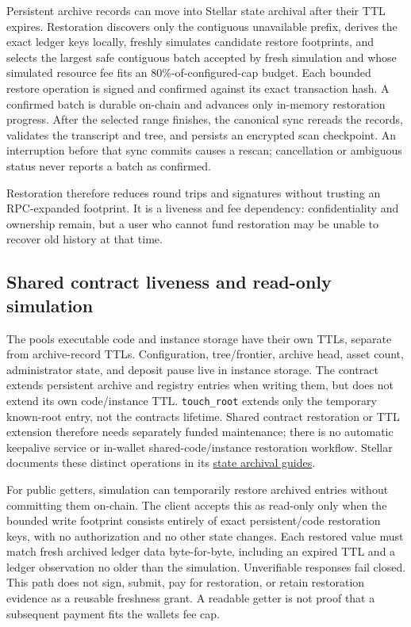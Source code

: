\documentclass[11pt,letterpaper]{article}
\begin{document}
Persistent archive records can move into Stellar state archival after
their TTL expires. Restoration discovers only the contiguous unavailable
prefix, derives the exact ledger keys locally, freshly simulates
candidate restore footprints, and selects the largest safe contiguous
batch accepted by fresh simulation and whose simulated resource fee fits
an 80\%-of-configured-cap budget. Each bounded restore operation is
signed and confirmed against its exact transaction hash. A confirmed
batch is durable on-chain and advances only in-memory restoration
progress. After the selected range finishes, the canonical sync rereads
the records, validates the transcript and tree, and persists an
encrypted scan checkpoint. An interruption before that sync commits
causes a rescan; cancellation or ambiguous status never reports a batch
as confirmed.

Restoration therefore reduces round trips and signatures without
trusting an RPC-expanded footprint. It is a liveness and fee dependency:
confidentiality and ownership remain, but a user who cannot fund
restoration may be unable to recover old history at that time.

\subsection{Shared contract liveness and read-only
simulation}\label{shared-contract-liveness-and-read-only-simulation}

The pool\textquotesingle s executable code and instance storage have
their own TTLs, separate from archive-record TTLs. Configuration,
tree/\allowbreak{}frontier, archive head, asset count, administrator
state, and deposit pause live in instance storage. The contract extends
persistent archive and registry entries when writing them, but does not
extend its own code/\allowbreak{}instance TTL. \texttt{touch\_root}
extends only the temporary known-root entry, not the
contract\textquotesingle s lifetime. Shared contract restoration or TTL
extension therefore needs separately funded maintenance; there is no
automatic keepalive service or in-wallet
shared-code/\allowbreak{}instance restoration workflow. Stellar
documents these distinct operations in its
\href{https://developers.stellar.org/docs/build/guides/archival}{state
archival guides}.

For public getters, simulation can temporarily restore archived entries
without committing them on-chain. The client accepts this as read-only
only when the bounded write footprint consists entirely of exact
persistent/\allowbreak{}code restoration keys, with no authorization and
no other state changes. Each restored value must match fresh archived
ledger data byte-for-byte, including an expired TTL and a ledger
observation no older than the simulation. Unverifiable responses fail
closed. This path does not sign, submit, pay for restoration, or retain
restoration evidence as a reusable freshness grant. A readable getter is
not proof that a subsequent payment fits the wallet\textquotesingle s
fee cap.
\end{document}
